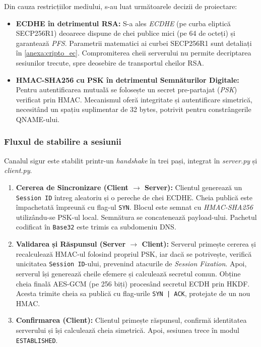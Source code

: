 Din cauza restricțiilor mediului, s-au luat următoarele decizii de proiectare:
\begin{itemize}
    \item \textbf{ECDHE în detrimentul RSA:} S-a ales \textit{ECDHE} (pe curba eliptică SECP256R1) deoarece dispune de chei publice mici (pe 64 de octeți) și garantează \textit{PFS}.  Parametrii matematici ai curbei SECP256R1 sunt detaliați în \ref{anexa:cripto_ec}. Compromiterea cheii serverului nu permite decriptarea sesiunilor trecute, spre deosebire de transportul cheilor RSA.
    \item \textbf{HMAC-SHA256 cu PSK în detrimentul Semnăturilor Digitale:} Pentru autentificarea mutuală se folosește un secret pre-partajat (\textit{PSK}) verificat prin HMAC. Mecanismul oferă integritate și autentificare simetrică, necesitând un spațiu suplimentar de 32 bytes, potrivit pentru constrângerile QNAME-ului.
\end{itemize}

\subsubsection{Fluxul de stabilire a sesiunii}
Canalul sigur este stabilit printr-un \textit{handshake} în trei pași, integrat în \textit{server.py} și \textit{client.py}.

\begin{enumerate}
    \item \textbf{Cererea de Sincronizare (Client $\rightarrow$ Server):} Clientul generează un \texttt{Session ID} întreg aleatoriu și o pereche de chei ECDHE. Cheia publică este împachetată împreună cu flag-ul \texttt{SYN}. Blocul este semnat cu \textit{HMAC-SHA256} utilizându-se PSK-ul local. Semnătura se concatenează payload-ului. Pachetul codificat în \texttt{Base32} este trimis ca subdomeniu DNS.
    \item \textbf{Validarea și Răspunsul (Server $\rightarrow$ Client):} Serverul primește cererea și recalculează HMAC-ul folosind propriul PSK, iar dacă se potrivește, verifică unicitatea \texttt{Session ID}-ului, prevenind atacurile de \textit{Session Fixation}. Apoi, serverul își generează cheile efemere și calculează secretul comun. Obține cheia finală AES-GCM (pe 256 biți) procesând secretul ECDH prin HKDF. Acesta trimite cheia sa publică cu flag-urile \texttt{SYN | ACK}, protejate de un nou HMAC.  
    \item \textbf{Confirmarea (Client):} Clientul primește răspunsul, confirmă identitatea serverului și își calculează cheia simetrică. Apoi, sesiunea trece în modul \texttt{ESTABLISHED}.
\end{enumerate}


